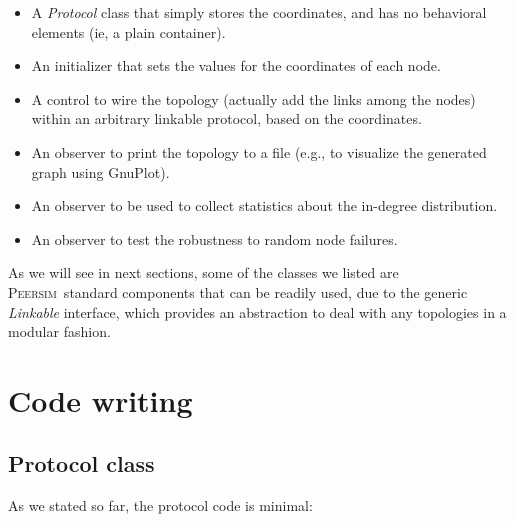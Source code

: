 \documentclass[a4paper,11pt]{article}
\newcommand{\id}[1]{{\scshape\small #1}}
\newcommand{\psim}{\id{Peersim}}
\begin{document}
\begin{itemize}

\item A \emph{Protocol} class that simply stores the coordinates,
and has no behavioral elements (ie, a plain container).
 
\item An initializer that sets the values for the coordinates of each node.

\item A control to wire the topology (actually add the links among the
nodes) within an arbitrary linkable protocol, based on the coordinates.

\item An observer to print the topology to a file (e.g., to
  visualize the generated graph using GnuPlot).

\item An observer to be used to collect statistics about the
  in-degree distribution.

\item An observer to test the robustness to random node
  failures.


\end{itemize}

As we will see in next sections, some of the classes we listed are
\psim\ standard components that can be readily used, due to the generic
\emph{Linkable} interface, which provides an abstraction to deal with any
topologies in a modular fashion.


\section{Code writing}

\subsection{Protocol class}

As we stated so far, the protocol code is minimal:
\end{document}
